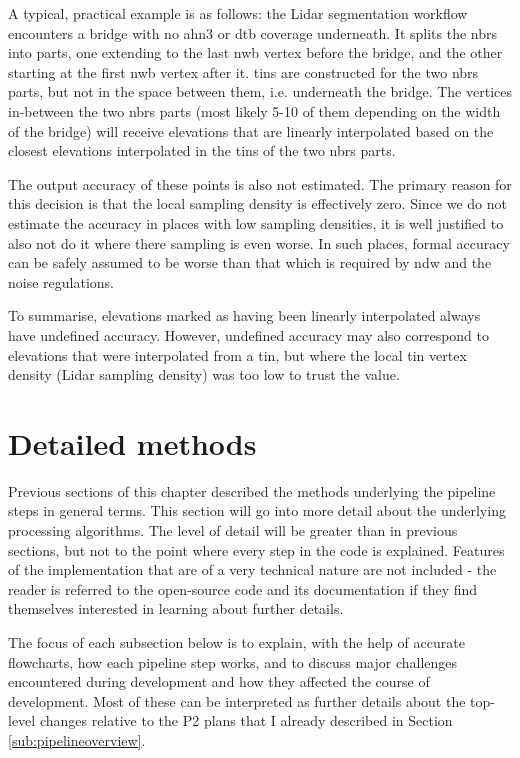 A typical, practical example is as follows: the Lidar segmentation workflow encounters a bridge with no \ac{ahn3} or \ac{dtb} coverage underneath. It splits the \ac{nbrs} into parts, one extending to the last \ac{nwb} vertex before the bridge, and the other starting at the first \ac{nwb} vertex after it. \ac{tin}s are constructed for the two \ac{nbrs} parts, but not in the space between them, i.e. underneath the bridge. The vertices in-between the two \ac{nbrs} parts (most likely 5-10 of them depending on the width of the bridge) will receive elevations that are linearly interpolated based on the closest elevations interpolated in the \ac{tin}s of the two \ac{nbrs} parts.

The output accuracy of these points is also not estimated. The primary reason for this decision is that the local sampling density is effectively zero. Since we do not estimate the accuracy in places with low sampling densities, it is well justified to also not do it where there sampling is even worse. In such places, formal accuracy can be safely assumed to be worse than that which is required by \ac{ndw} and the noise regulations.

To summarise, elevations marked as having been linearly interpolated always have undefined accuracy. However, undefined accuracy may also correspond to elevations that were interpolated from a \ac{tin}, but where the local \ac{tin} vertex density (Lidar sampling density) was too low to trust the value.

\section{Detailed methods}
\label{sec:methods}

Previous sections of this chapter described the methods underlying the pipeline steps in general terms. This section will go into more detail about the underlying processing algorithms. The level of detail will be greater than in previous sections, but not to the point where every step in the code is explained. Features of the implementation that are of a very technical nature are not included - the reader is referred to the open-source code and its documentation if they find themselves interested in learning about further details.

The focus of each subsection below is to explain, with the help of accurate flowcharts, how each pipeline step works, and to discuss major challenges encountered during development and how they affected the course of development. Most of these can be interpreted as further details about the top-level changes relative to the P2 plans that I already described in Section \ref{sub:pipelineoverview}.

